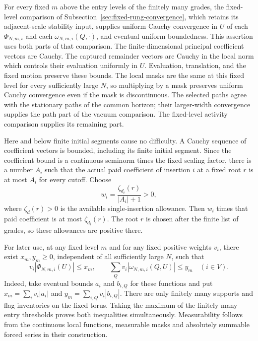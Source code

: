 For every fixed $m$ above the entry levels of the finitely many grades,
the fixed-level comparison of Subsection~\ref{sec:fixed-rung-convergence},
which retains its adjacent-scale stability input, supplies uniform Cauchy
convergence in $U$
of each $\Phi_{N,m,i}$ and each $\omega_{N,m,i}(Q,\cdot)$, and
eventual uniform boundedness. This assertion uses both parts of that
comparison. The finite-dimensional principal coefficient vectors are
Cauchy. The captured remainder vectors are Cauchy in the local norm
which controls their evaluation uniformly in $U$. Evaluation, translation,
and the fixed motion preserve these bounds. The local masks are the
same at this fixed level for every sufficiently large $N$, so
multiplying by a mask preserves uniform Cauchy convergence even if
the mask is discontinuous. The selected paths agree with the stationary
paths of the common horizon; their larger-width convergence supplies
the path part of the vacuum comparison. The fixed-level activity
comparison supplies its remaining part.

Here and below finite initial segments cause no difficulty. A Cauchy
sequence of coefficient vectors is bounded, including its finite initial
segment. Since the coefficient bound is a continuous seminorm times
the fixed scaling factor, there is a number $A_i$ such that the actual
paid coefficient of insertion $i$ at a fixed root $r$ is at most $A_i$
for every cutoff. Choose
\begin{equation}\label{eq:fullmesh-root-weights}
 w_i=\frac{\zeta_{d_i}(r)}{|A_i|+1}>0,
\end{equation}
where $\zeta_d(r)>0$ is the available single-insertion allowance.
Then $w_i$ times that paid coefficient is at most $\zeta_{d_i}(r)$.
The root $r$ is chosen after the finite list of grades, so these
allowances are positive there.

For later use, at any fixed level $m$ and for any fixed positive
weights $v_i$, there exist $x_m,y_m\ge0$, independent of all
sufficiently large $N$, such that
\begin{equation}\label{eq:fullmesh-vault}
 v_i|\Phi_{N,m,i}(U)|\le x_m,\qquad
 \sum_Q v_i|\omega_{N,m,i}(Q,U)|\le y_m
 \quad(i\in V).
\end{equation}
Indeed, take eventual bounds $a_i$ and $b_{i,Q}$ for these functions
and put $x_m=\sum_i v_i|a_i|$ and
$y_m=\sum_{i,Q}v_i|b_{i,Q}|$. There are only finitely many supports
and flag inventories on the fixed torus. Taking the maximum of the
finitely many entry thresholds proves both inequalities simultaneously.
Measurability follows from the continuous local functions, measurable
masks and absolutely summable forced series in their construction.

